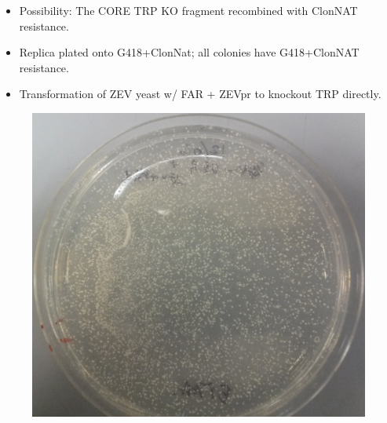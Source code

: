 \documentclass{beamer}
\begin{document}
\begin{frame}
    \begin{itemize}
        \item Possibility: The CORE TRP KO fragment recombined with ClonNAT resistance.
        \item Replica plated onto G418+ClonNat; all colonies have G418+ClonNAT resistance.
            \pause
        \item Transformation of ZEV yeast w/ FAR + ZEVpr to knockout TRP directly.
    \end{itemize}
    \begin{figure}[ht!]
        \centering
        \includegraphics[width=.6\textwidth]{5FAA1206.png}
        \label{fig:faa}
    \end{figure}

\end{frame}
\end{document}
